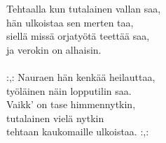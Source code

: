 
Tehtaalla kun tutalainen vallan saa, \\ hän ulkoistaa sen merten taa, \\ siellä missä orjatyötä teettää saa, \\ ja verokin on alhaisin. \\ \hspace{10mm} \\ :,: Nauraen hän kenkää heilauttaa, \\ työläinen näin lopputilin saa. \\ Vaikk' on tase himmennytkin, \\ tutalainen vielä nytkin \\ tehtaan kaukomaille ulkoistaa. :,: